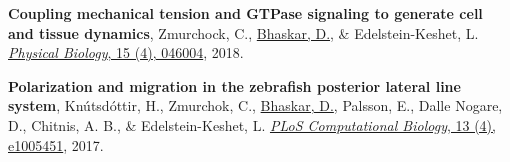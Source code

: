 \documentclass[margin,line]{res}
\begin{document}
\begin{resume}
{\begin{etaremune}[start=3]
\item{\bf Coupling mechanical tension and GTPase signaling to generate cell and tissue dynamics}, 
Zmurchock, C., \underline{Bhaskar, D.}, \& Edelstein-Keshet, L. 
\href{https://iopscience.iop.org/article/10.1088/1478-3975/aab1c0/meta}{\textit{Physical Biology}, 15 (4), 046004}, 2018.
\vspace*{.1cm}

\item{\bf Polarization and migration in the zebrafish posterior lateral line system}, 
Kn\'{u}tsd\'{o}ttir, H., Zmurchok, C., \underline{Bhaskar, D.}, Palsson, E., Dalle Nogare, D., Chitnis, A. B., \& Edelstein-Keshet, L. 
\href{https://journals.plos.org/ploscompbiol/article?id=10.1371/journal.pcbi.1005451&rev=2}{\textit{PLoS Computational Biology}, 13 (4), e1005451}, 2017.

\end{etaremune}
}



\end{resume}
\end{document}
